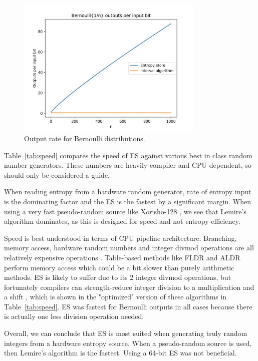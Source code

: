 \documentclass[12pt]{article}
\begin{document}
\begin{figure}[ht]
\centering
\includegraphics[width=0.8\textwidth]{bernoulli_rate.png}
\caption{Output rate for Bernoulli distributions.}
\label{fig:bernoulli-rate}
\end{figure}

Table~\ref{tab:speed} compares the speed of ES against various best in class random number generators. These numbers are heavily compiler and CPU dependent, so should only be considered a guide.

When reading entropy from a hardware random generator, rate of entropy input is the dominating factor and the ES is the fastest by a significant margin. When using a very fast pseudo-random source like Xorisho-128 \cite{blackman21}, we see that Lemire's algorithm \cite{lemire2019fast} dominates, as this is designed for speed and not entropy-efficiency.

Speed is best understood in terms of CPU pipeline architecture. Branching, memory access, hardware random numbers and integer divmod operations are all relatively expensive operations \cite{Abel19a}. Table-based methods like FLDR \cite{saad2020fldr} and ALDR \cite{saad2025} perform memory access which could be a bit slower than purely arithmetic methods. ES is likely to suffer due to its 2 integer divmod operations, but fortunately compilers can strength-reduce integer division to a multiplication and a shift \cite{granlund94}, which is shown in the "optimized" version of these algorithms in Table~\ref{tab:speed}. ES was fastest for Bernoulli outputs in all cases because there is actually one less division operation needed.

Overall, we can conclude that ES is most suited when generating truly random integers from a hardware entropy source. When a pseudo-random source is used, then Lemire's algorithm is the fastest. Using a 64-bit ES was not beneficial.
\end{document}
